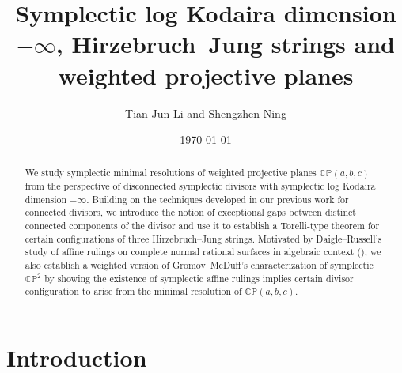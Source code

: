 \documentclass[11pt]{article}
\title{Symplectic log Kodaira dimension $-\infty$, Hirzebruch--Jung strings and weighted projective planes}
\author{Tian-Jun Li and Shengzhen Ning}
\date{\today}
\theoremstyle{definition}
\theoremstyle{remark}
\begin{document}
\maketitle

\begin{abstract}
We study symplectic minimal resolutions of weighted projective planes $\mathbb{CP}(a,b,c)$ from the perspective of disconnected symplectic divisors with symplectic log Kodaira dimension $-\infty$. Building on the techniques developed in our previous work \cite{LN25} for connected divisors, we introduce the notion of exceptional gaps between distinct connected components of the divisor and use it to establish a Torelli-type theorem for certain configurations of three Hirzebruch--Jung strings. Motivated by Daigle--Russell's study of affine rulings on complete normal rational surfaces in algebraic context (\cite{DP1,DP2}), we also establish a weighted version of Gromov--McDuff's characterization of symplectic $\mathbb{CP}^2$ by showing the existence of symplectic affine rulings implies certain divisor configuration to arise from the minimal resolution of $\mathbb{CP}(a,b,c)$.
\end{abstract}

\tableofcontents

\section{Introduction}
\end{document}
